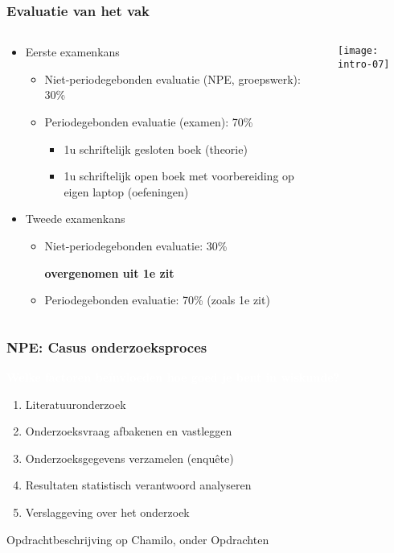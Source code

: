 \documentclass[aspectratio=169]{beamer}
\newcommand{\alertbox}[1]{%
  \begin{center}
    \colorbox{hgblue}{\textcolor{white}{\textbf{#1}}}
  \end{center}
}
\begin{document}
\begin{frame}
  \frametitle{Evaluatie van het vak}

  \begin{columns}
    \begin{column}{.8\textwidth}
      \begin{itemize}
        \item Eerste examenkans
        \begin{itemize}
          \item Niet-periodegebonden evaluatie (NPE, groepswerk): 30\%
          \item Periodegebonden evaluatie (examen): 70\%
          \begin{itemize}
            \item 1u schriftelijk gesloten boek (theorie)
            \item 1u schriftelijk open boek met voorbereiding op eigen laptop (oefeningen)
          \end{itemize}
        \end{itemize}
        \item Tweede examenkans
        \begin{itemize}
          \item Niet-periodegebonden evaluatie: 30\%
          
          \textbf{overgenomen uit 1e zit}
          \item Periodegebonden evaluatie: 70\% (zoals 1e zit)
        \end{itemize}
      \end{itemize}
    \end{column}
    \begin{column}{.2\textwidth}
      \texttt{[image: intro-07]}
    \end{column}
  \end{columns}

\end{frame}

\begin{frame}
  \frametitle{NPE: Casus onderzoeksproces}
  
  \alertbox{Welke factoren beïnvloeden hoe goed je bent in wiskunde?}
  
  \begin{enumerate}
    \item Literatuuronderzoek
    \item Onderzoeksvraag afbakenen en vastleggen
    \item Onderzoeksgegevens verzamelen (enquête)
    \item Resultaten statistisch verantwoord analyseren
    \item Verslaggeving over het onderzoek
  \end{enumerate}
  
  Opdrachtbeschrijving op Chamilo, onder Opdrachten
\end{frame}
\end{document}
